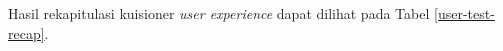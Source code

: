 Hasil rekapitulasi kuisioner \textit{user experience} dapat dilihat pada Tabel \ref{user-test-recap}.
